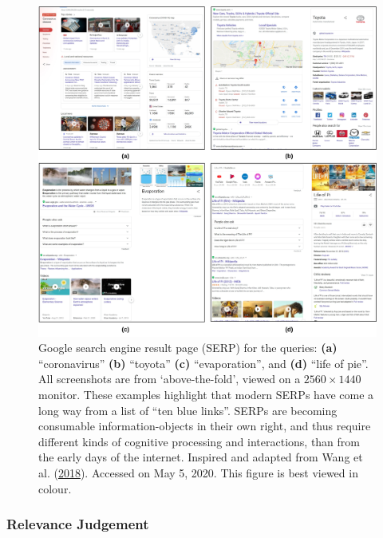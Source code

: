 \documentclass[letterpaper, nobind]{templates/ociamthesis}
\begin{document}
\begin{figure}

{\centering \includegraphics[width=1\linewidth]{figs/int-L-serp-new-vertical} 

}

\caption[Examples of Google SERP going beyond the ``ten blue links'' paradigm.]{Google search engine result page (SERP) for the queries: \textbf{(a)} ``coronavirus'' \textbf{(b)} ``toyota'' \textbf{(c)} ``evaporation'', and \textbf{(d)} ``life of pie''. All screenshots are from `above-the-fold', viewed on a \(2560 \times 1440\) monitor. These examples highlight that modern SERPs have come a long way from a list of ``ten blue links''. SERPs are becoming consumable information-objects in their own right, and thus require different kinds of cognitive processing and interactions, than from the early days of the internet. Inspired and adapted from Wang et al. (\protect\hyperlink{ref-yue2018optimizing}{2018}). Accessed on May 5, 2020. This figure is best viewed in colour.}\label{fig:int-L-serp-new-vertical}
\end{figure}





\hypertarget{relevance-judgement}{%
\subsubsection{Relevance Judgement}\label{relevance-judgement}}
\end{document}
